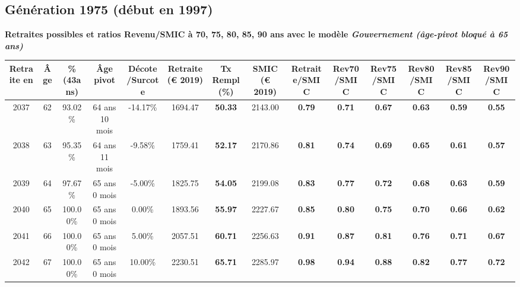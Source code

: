\subsection{Génération 1975 (début en 1997)} 

{\bf \noindent Retraites possibles et ratios Revenu/SMIC à 70, 75, 80, 85, 90 ans avec le modèle \emph{Gouvernement (âge-pivot bloqué à 65 ans)}}  
 
\begin{adjustbox}{max width=\textwidth} 
\begin{tabular}[htb]{|c|c||c|c|c||c|c||c||c|c|c|c|c|c|} 
\hline 
 Retraite en &  Âge &  \%(43ans) &  Âge pivot &  Décote/Surcote &  Retraite (\euro{} 2019) &  Tx Rempl(\%) &  SMIC (\euro{} 2019) &  Retraite/SMIC &  Rev70/SMIC &  Rev75/SMIC &  Rev80/SMIC &  Rev85/SMIC &  Rev90/SMIC \\ 
\hline \hline 
 2037 &  62 &  93.02\% &  64 ans 10 mois &  -14.17\% &  1694.47 &  {\bf 50.33} &  2143.00 &  {\bf {\color{red} 0.79}} &  {\bf {\color{red} 0.71}} &  {\bf {\color{red} 0.67}} &  {\bf {\color{red} 0.63}} &  {\bf {\color{red} 0.59}} &  {\bf {\color{red} 0.55}} \\ 
\hline 
 2038 &  63 &  95.35\% &  64 ans 11 mois &  -9.58\% &  1759.41 &  {\bf 52.17} &  2170.86 &  {\bf {\color{red} 0.81}} &  {\bf {\color{red} 0.74}} &  {\bf {\color{red} 0.69}} &  {\bf {\color{red} 0.65}} &  {\bf {\color{red} 0.61}} &  {\bf {\color{red} 0.57}} \\ 
\hline 
 2039 &  64 &  97.67\% &  65 ans 0 mois &  -5.00\% &  1825.75 &  {\bf 54.05} &  2199.08 &  {\bf {\color{red} 0.83}} &  {\bf {\color{red} 0.77}} &  {\bf {\color{red} 0.72}} &  {\bf {\color{red} 0.68}} &  {\bf {\color{red} 0.63}} &  {\bf {\color{red} 0.59}} \\ 
\hline 
 2040 &  65 &  100.00\% &  65 ans 0 mois &  0.00\% &  1893.56 &  {\bf 55.97} &  2227.67 &  {\bf {\color{red} 0.85}} &  {\bf {\color{red} 0.80}} &  {\bf {\color{red} 0.75}} &  {\bf {\color{red} 0.70}} &  {\bf {\color{red} 0.66}} &  {\bf {\color{red} 0.62}} \\ 
\hline 
 2041 &  66 &  100.00\% &  65 ans 0 mois &  5.00\% &  2057.51 &  {\bf 60.71} &  2256.63 &  {\bf {\color{red} 0.91}} &  {\bf {\color{red} 0.87}} &  {\bf {\color{red} 0.81}} &  {\bf {\color{red} 0.76}} &  {\bf {\color{red} 0.71}} &  {\bf {\color{red} 0.67}} \\ 
\hline 
 2042 &  67 &  100.00\% &  65 ans 0 mois &  10.00\% &  2230.51 &  {\bf 65.71} &  2285.97 &  {\bf {\color{red} 0.98}} &  {\bf {\color{red} 0.94}} &  {\bf {\color{red} 0.88}} &  {\bf {\color{red} 0.82}} &  {\bf {\color{red} 0.77}} &  {\bf {\color{red} 0.72}} \\ 
\hline 
\hline 
\end{tabular} 
\end{adjustbox} 
 
